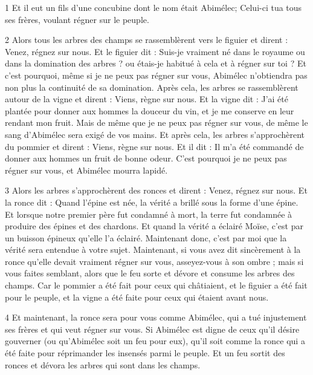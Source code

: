 
\par 1 Et il eut un fils d'une concubine dont le nom était Abimélec; Celui-ci tua tous ses frères, voulant régner sur le peuple.

\par [Une feuille disparue.]

\par 2 Alors tous les arbres des champs se rassemblèrent vers le figuier et dirent : Venez, régnez sur nous. Et le figuier dit : Suis-je vraiment né dans le royaume ou dans la domination des arbres ? ou étais-je habitué à cela et à régner sur toi ? Et c'est pourquoi, même si je ne peux pas régner sur vous, Abimélec n'obtiendra pas non plus la continuité de sa domination. Après cela, les arbres se rassemblèrent autour de la vigne et dirent : Viens, règne sur nous. Et la vigne dit : J'ai été plantée pour donner aux hommes la douceur du vin, et je me conserve en leur rendant mon fruit. Mais de même que je ne peux pas régner sur vous, de même le sang d'Abimélec sera exigé de vos mains. Et après cela, les arbres s'approchèrent du pommier et dirent : Viens, règne sur nous. Et il dit : Il m'a été commandé de donner aux hommes un fruit de bonne odeur. C'est pourquoi je ne peux pas régner sur vous, et Abimélec mourra lapidé.

\par 3 Alors les arbres s'approchèrent des ronces et dirent : Venez, régnez sur nous. Et la ronce dit : Quand l'épine est née, la vérité a brillé sous la forme d'une épine. Et lorsque notre premier père fut condamné à mort, la terre fut condamnée à produire des épines et des chardons. Et quand la vérité a éclairé Moïse, c’est par un buisson épineux qu’elle l’a éclairé. Maintenant donc, c'est par moi que la vérité sera entendue à votre sujet. Maintenant, si vous avez dit sincèrement à la ronce qu'elle devait vraiment régner sur vous, asseyez-vous à son ombre ; mais si vous faites semblant, alors que le feu sorte et dévore et consume les arbres des champs. Car le pommier a été fait pour ceux qui châtiaient, et le figuier a été fait pour le peuple, et la vigne a été faite pour ceux qui étaient avant nous.

\par 4 Et maintenant, la ronce sera pour vous comme Abimélec, qui a tué injustement ses frères et qui veut régner sur vous. Si Abimélec est digne de ceux qu'il désire gouverner (ou qu'Abimélec soit un feu pour eux), qu'il soit comme la ronce qui a été faite pour réprimander les insensés parmi le peuple. Et un feu sortit des ronces et dévora les arbres qui sont dans les champs.

